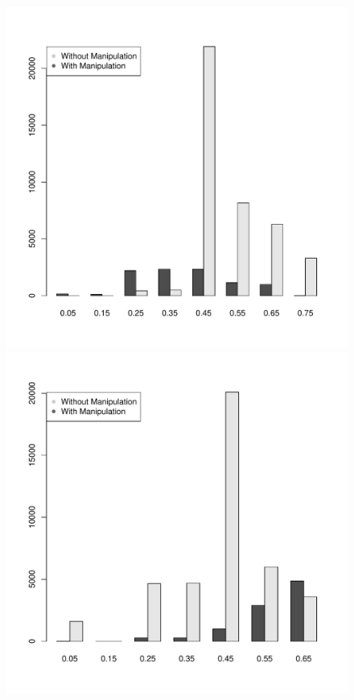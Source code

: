 \documentclass[12pt,letterpaper]{article} %
\begin{document}
\begin{center}
\begin{figure}[h!]
\begin{minipage}{0.45\textwidth}
\begin{center}
\includegraphics[scale=0.4]{../graphics/nonmanipulators-utilities.pdf}
\end{center}
\end{minipage}
\hspace{0.05\textwidth}
\begin{minipage}{0.45\textwidth}
\begin{center}
\includegraphics[scale=0.4]{../graphics/manipulator-utilities.pdf}

\end{center}
\end{minipage}
\end{figure}
\end{center}
\end{document}

